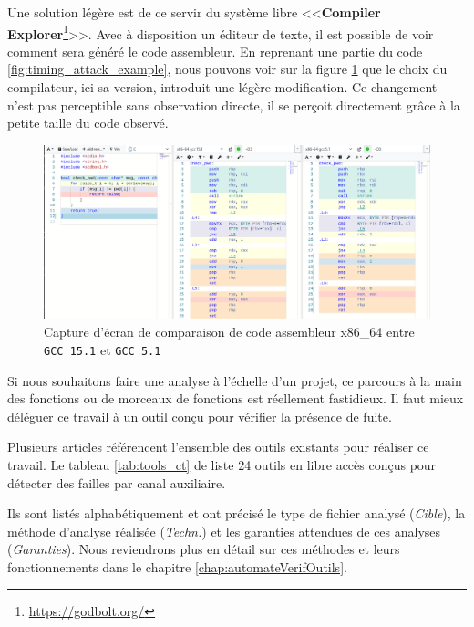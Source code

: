 Une solution légère est de ce servir du système libre <<\textbf{Compiler Explorer}\footnote{\url{https://godbolt.org/}}>>. Avec à disposition un éditeur de texte, il est possible de voir comment sera généré le code assembleur. En reprenant une partie du code \ref{fig:timing_attack_example}, nous pouvons voir sur la figure \ref{img:godbolt_example} que le choix du compilateur, ici sa version, introduit une légère modification. Ce changement n'est pas perceptible sans observation directe, il se perçoit directement grâce à la petite taille du code observé.

\begin{figure}[!h]
  \begin{adjustwidth}{-18mm}{0mm}
    \centering
    \includegraphics[trim = 1mm 0mm 0mm 0mm, clip,width=0.9\paperwidth]{pictures/godbolt_example.png}
    \caption{Capture d'écran de comparaison de code assembleur x86\_64 entre \texttt{GCC 15.1} et \texttt{GCC 5.1}}
    \label{img:godbolt_example}
  \end{adjustwidth}
\end{figure}

Si nous souhaitons faire une analyse à l'échelle d'un projet, ce parcours à la main des fonctions ou de morceaux de fonctions est réellement fastidieux. Il faut mieux déléguer ce travail à un outil conçu pour vérifier la présence de fuite.\smallbreak

Plusieurs articles référencent l'ensemble des outils existants \cite{notThatHardCT, GeimerEvaluationsSideChannel} pour réaliser ce travail. Le tableau \ref{tab:tools_ct} de \citeauthor{notThatHardCT} liste 24 outils en libre accès conçus pour détecter des failles par canal auxiliaire.

Ils sont listés alphabétiquement et ont précisé le type de fichier analysé (\textit{Cible}), la méthode d'analyse réalisée (\textit{Techn.}) et les garanties attendues de ces analyses (\textit{Garanties}). Nous reviendrons plus en détail sur ces méthodes et leurs fonctionnements dans le chapitre \ref{chap:automateVerifOutils}.\medbreak

